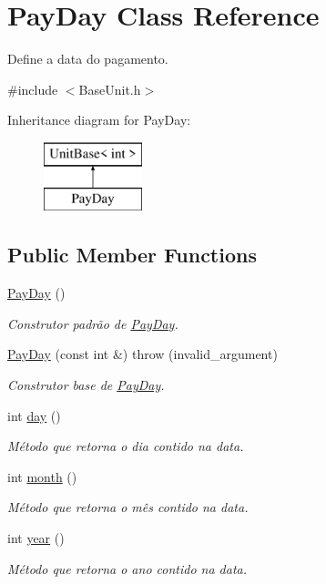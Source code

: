 \hypertarget{classPayDay}{\section{Pay\-Day Class Reference}
\label{dc/d17/classPayDay}
}


Define a data do pagamento.  




{\ttfamily \#include $<$Base\-Unit.\-h$>$}

Inheritance diagram for Pay\-Day\-:\begin{figure}[H]
\begin{center}
\leavevmode
\includegraphics[height=2.000000cm]{dc/d17/classPayDay}
\end{center}
\end{figure}
\subsection*{Public Member Functions}
\begin{DoxyCompactItemize}
\item 
\hyperlink{classPayDay_a6da36cea0b2ac9a53106552aad00996a}{Pay\-Day} ()
\begin{DoxyCompactList}\small\item\em Construtor padrão de \hyperlink{classPayDay}{Pay\-Day}. \end{DoxyCompactList}\item 
\hyperlink{classPayDay_aa11abdfdb58bbd93f68bc02a7496e1c4}{Pay\-Day} (const int \&)  throw (invalid\-\_\-argument)
\begin{DoxyCompactList}\small\item\em Construtor base de \hyperlink{classPayDay}{Pay\-Day}. \end{DoxyCompactList}\item 
int \hyperlink{classPayDay_a297ce892f49aa9f3a504d514f171ed1d}{day} ()
\begin{DoxyCompactList}\small\item\em Método que retorna o dia contido na data. \end{DoxyCompactList}\item 
int \hyperlink{classPayDay_ada65e8834c142a95cd35ca2b399fbcde}{month} ()
\begin{DoxyCompactList}\small\item\em Método que retorna o mês contido na data. \end{DoxyCompactList}\item 
int \hyperlink{classPayDay_a962960925f9e6eaaac0fef5eb96849ec}{year} ()
\begin{DoxyCompactList}\small\item\em Método que retorna o ano contido na data. \end{DoxyCompactList}\end{DoxyCompactItemize}

